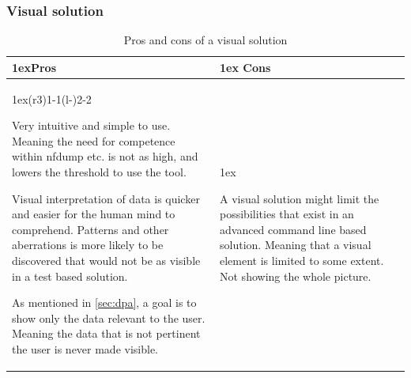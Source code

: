 \subsubsection{Visual solution}
\begin{table}[h!]
\begin{tabularx}{\linewidth}{>{\parskip1ex}X@{\kern4\tabcolsep}>{\parskip1ex}X}
\toprule
\hfil\bfseries Pros
&
\hfil\bfseries Cons
\\\cmidrule(r{3\tabcolsep}){1-1}\cmidrule(l{-\tabcolsep}){2-2}

Very intuitive and simple to use. Meaning the need for competence within nfdump etc. is not as high, and lowers the threshold to use the tool.

Visual interpretation of data is quicker and easier for the human mind to comprehend. Patterns and other aberrations is more likely to be discovered that would not be as visible in a test based solution.

As mentioned in \ref{sec:dpa}, a goal is to show only the data relevant to the user. Meaning the data that is not pertinent the user is never made visible.

&

A visual solution might limit the possibilities that exist in an advanced command line based solution. Meaning that a visual element is limited to some extent. Not showing the whole picture. 

\\\bottomrule
\end{tabularx}
\caption{Pros and cons of a visual solution}
\end{table}

